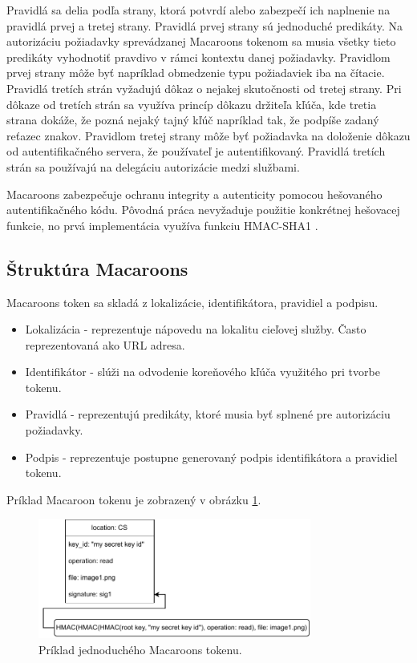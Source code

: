 Pravidlá sa delia podľa strany, ktorá potvrdí alebo zabezpečí ich naplnenie na pravidlá prvej a tretej strany. Pravidlá prvej strany sú jednoduché predikáty. Na autorizáciu požiadavky sprevádzanej Macaroons tokenom sa musia všetky tieto predikáty vyhodnotiť pravdivo v rámci kontextu danej požiadavky. Pravidlom prvej strany môže byť napríklad obmedzenie typu požiadaviek iba na čítacie. Pravidlá tretích strán vyžadujú dôkaz o nejakej skutočnosti od tretej strany. Pri dôkaze od tretích strán sa využíva princíp dôkazu držiteľa kľúča, kde tretia strana dokáže, že pozná nejaký tajný kľúč napríklad tak, že podpíše zadaný reťazec znakov. Pravidlom tretej strany môže byť požiadavka na doloženie dôkazu od autentifikačného servera, že používateľ je autentifikovaný. Pravidlá tretích strán sa používajú na delegáciu autorizácie medzi službami.

Macaroons zabezpečuje ochranu integrity a autenticity pomocou hešovaného autentifikačného kódu. Pôvodná práca \cite{macaroons_paper} nevyžaduje použitie konkrétnej hešovacej funkcie, no prvá implementácia \cite{macaroons_git} využíva funkciu HMAC-SHA1 \cite{hmac_sha1}.

\subsection{Štruktúra Macaroons}

Macaroons token sa skladá z lokalizácie, identifikátora, pravidiel a podpisu. 

\begin{itemize}
    \item Lokalizácia - reprezentuje nápovedu na lokalitu cieľovej služby. Často reprezentovaná ako URL adresa.
    \item Identifikátor - slúži na odvodenie koreňového kľúča využitého pri tvorbe tokenu.
    \item Pravidlá - reprezentujú predikáty, ktoré musia byť splnené pre autorizáciu požiadavky.
    \item Podpis - reprezentuje postupne generovaný podpis identifikátora a pravidiel tokenu.
\end{itemize}

Príklad Macaroon tokenu je zobrazený v obrázku \ref{fig:macaroon_example}.


\begin{figure}
    \centerline{\includegraphics[width=0.8\textwidth]{images/basic_macaroon}}
    \caption[Macaroons token]{Príklad jednoduchého Macaroons tokenu.}
    \label{fig:macaroon_example}
\end{figure}

